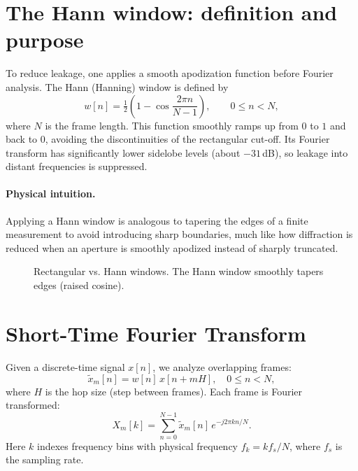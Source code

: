 \documentclass[11pt]{article}
\begin{document}
\section*{The Hann window: definition and purpose}
To reduce leakage, one applies a smooth apodization function before Fourier analysis. The Hann
(Hanning) window is defined by
\begin{equation}
    w[n]=\tfrac{1}{2}\left(1-\cos\frac{2\pi n}{N-1}\right),\qquad 0\le n<N,
\end{equation}
where $N$ is the frame length. This function smoothly ramps up from $0$ to $1$ and back to $0$,
avoiding the discontinuities of the rectangular cut-off. Its Fourier transform has significantly
lower sidelobe levels (about $-31$\,dB), so leakage into distant frequencies is suppressed.

\paragraph{Physical intuition.} Applying a Hann window is analogous to tapering the edges of a finite
measurement to avoid introducing sharp boundaries, much like how diffraction is reduced when an
aperture is smoothly apodized instead of sharply truncated.

\begin{figure}[h]
    \centering
    \caption{Rectangular vs. Hann windows. The Hann window smoothly tapers edges (raised cosine).}
\end{figure}

\section*{Short-Time Fourier Transform}
Given a discrete-time signal $x[n]$, we analyze overlapping frames:
\begin{equation}
    \tilde{x}_m[n]=w[n]\,x[n+mH],\quad 0\le n<N,
\end{equation}
where $H$ is the hop size (step between frames). Each frame is Fourier transformed:
\begin{equation}
    X_m[k]=\sum_{n=0}^{N-1}\tilde{x}_m[n]\,e^{-j2\pi kn/N}.
\end{equation}
Here $k$ indexes frequency bins with physical frequency $f_k=k f_s/N$, where $f_s$ is the sampling
rate.
\end{document}
